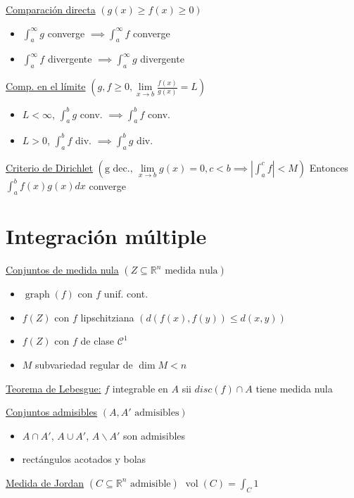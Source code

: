 \documentclass[12pt]{article}
\newcommand{\real}{\mathbb{R}}
\newcommand{\abs}[1]{\left\vert #1 \right\vert}
\DeclareMathOperator{\vol}{vol}
\DeclareMathOperator{\graph}{graph}
\begin{document}
\begin{multicols}{3}
\underline{Comparación directa} $\left( g(x) \geq f(x) \geq 0 \right)$
\begin{itemize}
	\item $\int_{a}^{\infty} g$ converge $\implies \int_{a}^{\infty} f$ converge
	\item $\int_{a}^{\infty} f$ divergente $\implies \int_{a}^{\infty} g$ divergente
\end{itemize}

\underline{Comp. en el límite} $\left( g, f \geq 0,
\lim\limits_{x \to b} \frac{f(x)}{g(x)} = L \right)$
\begin{itemize}
	\item $L < \infty$, $\int_{a}^{b} g$ conv. $\implies \int_{a}^{b} f$ conv.
	\item $L > 0$, $\int_{a}^{b} f$ div. $\implies \int_{a}^{b} g$ div.
\end{itemize}

\underline{Criterio de Dirichlet} $\left(\text{g dec., }\lim\limits_{x \to b} g(x) = 0,
c < b \implies \abs{\int_{a}^{c} f} < M\right)$
Entonces $\int_{a}^{b} f(x)g(x)dx$ converge

\section{Integración múltiple}

\underline{Conjuntos de medida nula} $\left( Z \subseteq \real^n \text{ medida nula} \right)$
\begin{itemize}
	\item $\graph(f)$ con $f$ unif. cont.
	\item $f(Z)$ con $f$ lipschitziana $\left( d(f(x),f(y)) \leq d(x,y) \right)$
	\item $f(Z)$ con $f$ de clase $\mathcal{C}^1$
	\item $M$ subvariedad regular de $\dim M < n$
\end{itemize}

\underline{Teorema de Lebesgue:}
$f$ integrable en $A$ sii $disc(f) \cap A$ tiene medida nula

\underline{Conjuntos admisibles} $\left( A, A' \text{ admisibles} \right)$
\begin{itemize}
	\item $A \cap A'$, $A \cup A'$, $A \smallsetminus A'$ son admisibles
	\item rectángulos acotados y bolas
\end{itemize}

\underline{Medida de Jordan} $\left( C \subseteq \real^n \text{ admisible}\right)$
$\vol(C) = \int_{C}1$


\end{multicols}
\end{document}
